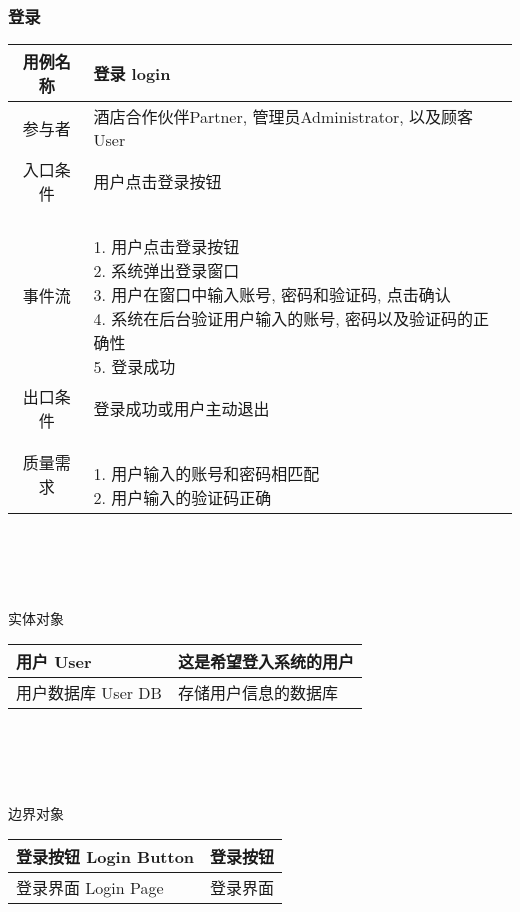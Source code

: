 \documentclass[11pt]{article}
\begin{document}
		\subsubsection{登录}
			\begin{tabular}{c|l}
			\hline
			用例名称 & 登录 login \\ \hline
			参与者 & 酒店合作伙伴Partner, 管理员Administrator, 以及顾客User  \\ \hline
			入口条件 & 用户点击登录按钮 \\ \hline
			事件流 & 	\parbox{33em}{\ \\
						1. 用户点击登录按钮 \\
						2. 系统弹出登录窗口 \\
						3. 用户在窗口中输入账号, 密码和验证码, 点击确认  \\
						4. 系统在后台验证用户输入的账号, 密码以及验证码的正确性 \\
						5. 登录成功 \\
						} \\ \hline
			出口条件 & 登录成功或用户主动退出 \\ \hline
			质量需求 & \parbox{33em}{\ \\
						1. 用户输入的账号和密码相匹配 \\
						2. 用户输入的验证码正确 \\
						} \\ \hline
			\end{tabular}\\ \\ \\ \\ 
			
						
			实体对象 \\
			\begin{tabular}{l|l}\hline
			用户 User & 这是希望登入系统的用户 \\ \hline
			用户数据库 User DB & 存储用户信息的数据库 \\ \hline
			\end{tabular} \\ \\ \\ \\


			边界对象 \\
			\begin{tabular}{l|l}\hline
			登录按钮 Login Button & 登录按钮 \\ \hline
			登录界面 Login Page & 登录界面 \\ \hline
			\end{tabular} \\ \\ \\ \\
\end{document}
